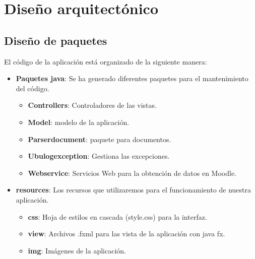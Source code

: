 \section{Diseño arquitectónico}

\subsection{Diseño de paquetes}

El código de la aplicación está organizado de la siguiente manera:

\begin{itemize}
	\tightlist
	\item
	\textbf{Paquetes java}: Se ha generado diferentes paquetes para el mantenimiento del código.
	\begin{itemize}
		\tightlist
		\item
		\textbf{Controllers}: Controladores de las vistas.
		
		
		\newpage\item
		\textbf{Model}: modelo de la aplicación.
		
		
		\item
		\textbf{Parserdocument}: paquete para documentos.
		
		\newpage\item
		\textbf{Ubulogexception}: Gestiona las excepciones.
		
		\item
		\textbf{Webservice}: Servicios Web para la obtención de datos en Moodle.
		
		
	\end{itemize}
	\item
	\textbf{resources}: Los recursos que utilizaremos para el funcionamiento de nuestra aplicación.
	\begin{itemize}
		\tightlist
		\item
		\textbf{css}: Hoja de estilos en cascada (style.css) para la interfaz.
		\item
		\textbf{view}: Archivos .fxml para las vista de la aplicación con java fx.
		
		\item
		\textbf{img}: Imágenes de la aplicación.
		
		
	\end{itemize}
	
\end{itemize}
\newpage
